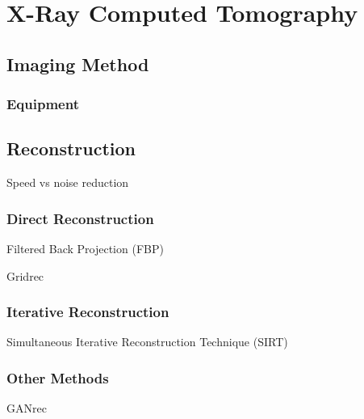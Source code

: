\chapter{X-Ray Computed Tomography}
\label{sec:ct}
\section{Imaging Method}
\subsection{Equipment}
\section{Reconstruction}
Speed vs noise reduction
\subsection{Direct Reconstruction}
Filtered Back Projection (FBP)

Gridrec
\subsection{Iterative Reconstruction}
Simultaneous Iterative Reconstruction Technique (SIRT)

\subsection{Other Methods}
GANrec